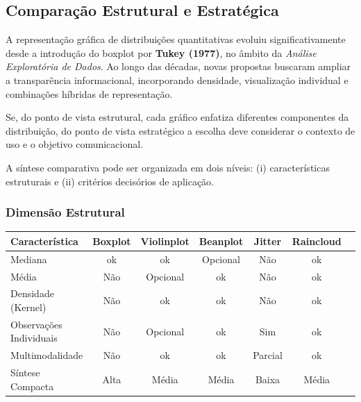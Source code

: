 \subsection{Comparação Estrutural e Estratégica}


A representação gráfica de distribuições quantitativas evoluiu significativamente desde a introdução do boxplot por \textbf{Tukey (1977)}, no âmbito da \textit{Análise Exploratória de Dados}. Ao longo das décadas, novas propostas buscaram ampliar a transparência informacional, incorporando densidade, visualização individual e combinações híbridas de representação. \vskip0.3cm

Se, do ponto de vista estrutural, cada gráfico enfatiza diferentes componentes da distribuição, do ponto de vista estratégico a escolha deve considerar o contexto de uso e o objetivo comunicacional. \vskip0.3cm


\newpage
A síntese comparativa pode ser organizada em dois níveis: (i) características estruturais e (ii) critérios decisórios de aplicação. \vskip0.3cm

\subsubsection{Dimensão Estrutural}

\begin{center}
\small
\begin{tabularx}{\textwidth}{l*{6}{c}}
\toprule
\textbf{Característica} & \textbf{Boxplot} & \textbf{Violinplot} & \textbf{Beanplot} & \textbf{Jitter} & \textbf{Raincloud} \\
\midrule
Mediana                     & ok   & ok       & Opcional & Não     & ok \\
Média                       & Não  & Opcional & ok       & Não     & ok \\
Densidade (Kernel)          & Não  & ok       & ok       & Não     & ok \\
Observações Individuais     & Não  & Opcional & ok       & Sim     & ok \\
Multimodalidade             & Não  & ok       & ok       & Parcial & ok \\
Síntese Compacta            & Alta & Média    & Média    & Baixa   & Média \\
\bottomrule
\end{tabularx}
\end{center}

